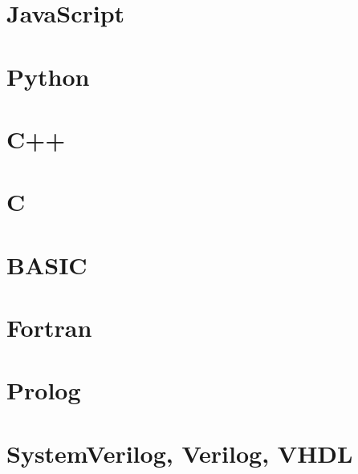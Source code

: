 \documentclass[letterpaper,12pt]{book}
\begin{document}
    \section{JavaScript}

    \section{Python}

    \section{C++}

    \section{C}

    \section{BASIC}

    \section{Fortran}

    \section{Prolog}

    \section{SystemVerilog, Verilog, VHDL}
    \label{app:installations:HDL}
\end{document}
